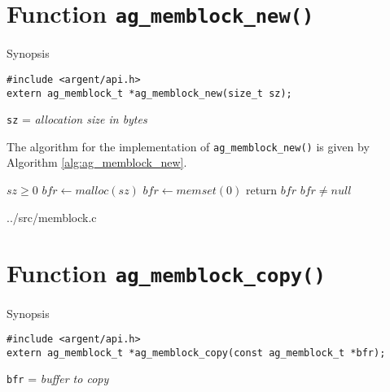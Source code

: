 %

\section{Function \texttt{ag\_memblock\_new()}}


\begin{bclogo}[logo=\bccrayon, noborder=true, barre=snake, couleurBarre=gray]
  {Synopsis}
\lstset{style=SYNOPSIS}

\begin{lstlisting}[linewidth=1.0\linewidth]
#include <argent/api.h>
extern ag_memblock_t *ag_memblock_new(size_t sz);
\end{lstlisting}

\scriptsize
\texttt{sz} = \emph{allocation size in bytes}
\end{bclogo}

The algorithm for the implementation of \verb|ag_memblock_new()| is given by
Algorithm \ref{alg:ag_memblock_new}.

\begin{algorithm}
\scriptsize
\caption{\texttt{ag\_memblock\_new()}}
\label{alg:ag_memblock_new}
\begin{algorithmic}
\Require $sz \geq 0$
\State $bfr \gets malloc(sz)$
\State $bfr \gets memset(0)$
\State return $bfr$
\EndProcedure
\Ensure $bfr \neq null$
\end{algorithmic}
\end{algorithm}

\lstset{style=CODE}

  {../src/memblock.c}

%


\section{Function \texttt{ag\_memblock\_copy()}}
\begin{bclogo}[logo=\bccrayon, noborder=true, barre=snake, couleurBarre=gray]
  {Synopsis}
\lstset{style=SYNOPSIS}
\begin{lstlisting}[linewidth=1.0\linewidth]
#include <argent/api.h>
extern ag_memblock_t *ag_memblock_copy(const ag_memblock_t *bfr);
\end{lstlisting}
\scriptsize
\texttt{bfr} = \emph{buffer to copy}
\end{bclogo}


